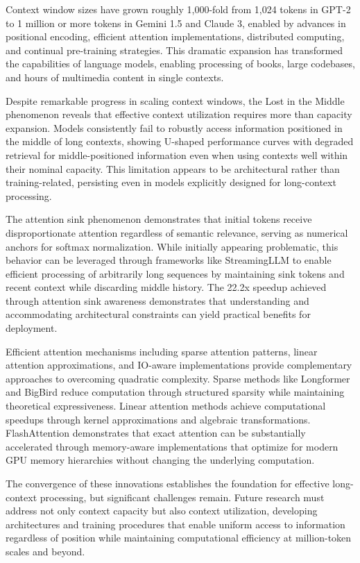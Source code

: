 \documentclass[11pt,letterpaper]{article}
\begin{document}
Context window sizes have grown roughly 1,000-fold from 1,024 tokens in GPT-2 to 1 million or more tokens in Gemini 1.5 and Claude 3, enabled by advances in positional encoding, efficient attention implementations, distributed computing, and continual pre-training strategies. This dramatic expansion has transformed the capabilities of language models, enabling processing of books, large codebases, and hours of multimedia content in single contexts.

Despite remarkable progress in scaling context windows, the Lost in the Middle phenomenon reveals that effective context utilization requires more than capacity expansion. Models consistently fail to robustly access information positioned in the middle of long contexts, showing U-shaped performance curves with degraded retrieval for middle-positioned information even when using contexts well within their nominal capacity. This limitation appears to be architectural rather than training-related, persisting even in models explicitly designed for long-context processing.

The attention sink phenomenon demonstrates that initial tokens receive disproportionate attention regardless of semantic relevance, serving as numerical anchors for softmax normalization. While initially appearing problematic, this behavior can be leveraged through frameworks like StreamingLLM to enable efficient processing of arbitrarily long sequences by maintaining sink tokens and recent context while discarding middle history. The 22.2x speedup achieved through attention sink awareness demonstrates that understanding and accommodating architectural constraints can yield practical benefits for deployment.

Efficient attention mechanisms including sparse attention patterns, linear attention approximations, and IO-aware implementations provide complementary approaches to overcoming quadratic complexity. Sparse methods like Longformer and BigBird reduce computation through structured sparsity while maintaining theoretical expressiveness. Linear attention methods achieve computational speedups through kernel approximations and algebraic transformations. FlashAttention demonstrates that exact attention can be substantially accelerated through memory-aware implementations that optimize for modern GPU memory hierarchies without changing the underlying computation.

The convergence of these innovations establishes the foundation for effective long-context processing, but significant challenges remain. Future research must address not only context capacity but also context utilization, developing architectures and training procedures that enable uniform access to information regardless of position while maintaining computational efficiency at million-token scales and beyond.
\end{document}
